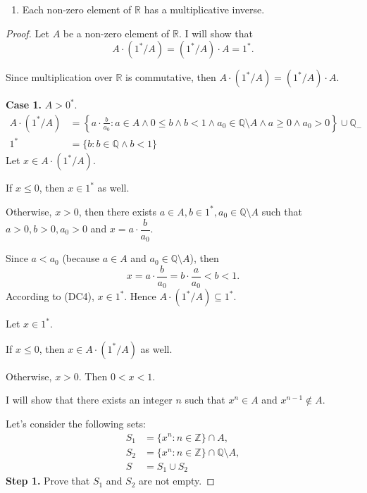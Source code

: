 \begin{theorem}\label{theorem:chapter1:multiplicative-inverse}
    \begin{enumerate}[label={(F\arabic*)},start=9]
        \item Each non-zero element of $\mathbb{R}$ has a multiplicative inverse.
    \end{enumerate}
\end{theorem}

\begin{proof}
    Let $A$ be a non-zero element of $\mathbb{R}$. I will show that
    \[
        A\cdot ({1}^{*}/A) = ({1}^{*}/A)\cdot A = {1}^{*}.
    \]

    Since multiplication over $\mathbb{R}$ is commutative, then $A\cdot ({1}^{*}/A) = ({1}^{*}/A)\cdot A$.

    \textbf{Case 1.} $A > {0}^{*}$.
    \[
        \begin{split}
            A\cdot ({1}^{*}/A) & = \left\{ a\cdot\frac{b}{a_{0}} : a\in A\land 0\le b\land b < 1\land a_{0}\in\mathbb{Q}\setminus A\land a\ge 0\land a_{0} > 0 \right\}\cup\mathbb{Q}_{-} \\
            {1}^{*} & = \{ b: b\in\mathbb{Q}\land b < 1 \}
        \end{split}
    \]
    Let $x\in A\cdot ({1}^{*}/A)$.

    If $x\le 0$, then $x\in {1}^{*}$ as well.

    Otherwise, $x > 0$, then there exists $a\in A, b\in {1}^{*}, a_{0}\in \mathbb{Q}\setminus A$ such that $a > 0, b > 0, a_{0} > 0$ and $x = a\cdot\dfrac{b}{a_{0}}$.

    Since $a < a_{0}$ (because $a\in A$ and $a_{0}\in\mathbb{Q}\setminus A$), then
    \[
        x = a\cdot\dfrac{b}{a_{0}} = b\cdot\dfrac{a}{a_{0}} < b < 1.
    \]
    According to (DC4), $x\in {1}^{*}$. Hence $A\cdot ({1}^{*}/A)\subseteq {1}^{*}$.

    \bigskip

    Let $x\in {1}^{*}$.

    If $x\le 0$, then $x\in A\cdot ({1}^{*}/A)$ as well.

    Otherwise, $x > 0$. Then $0 < x < 1$.

    I will show that there exists an integer $n$ such that $x^{n}\in A$ and $x^{n-1}\notin A$.

    Let's consider the following sets:
    \[
        \begin{split}
            S_{1} & = \{ {x}^{n} : n\in\mathbb{Z} \} \cap A, \\
            S_{2} & = \{ {x}^{n} : n\in\mathbb{Z} \} \cap \mathbb{Q}\setminus A, \\
            S & = S_{1}\cup S_{2}
        \end{split}
    \]
    \textbf{Step 1.} Prove that $S_{1}$ and $S_{2}$ are not empty.


\end{proof}
